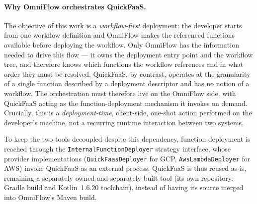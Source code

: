 \paragraph{Why OmniFlow orchestrates QuickFaaS.}
The objective of this work is a \emph{workflow-first} deployment: the developer starts from one
workflow definition and OmniFlow makes the referenced functions available before deploying
the workflow. Only OmniFlow has the information needed to drive this flow --- it owns the
deployment entry point and the workflow tree, and therefore knows which functions the
workflow references and in what order they must be resolved. QuickFaaS, by contrast, operates at the
granularity of a single function described by a deployment descriptor and has no notion of a
workflow. The orchestration must therefore live on the OmniFlow side, with QuickFaaS acting as the
function-deployment mechanism it invokes on demand. Crucially, this is a \emph{deployment-time},
client-side, one-shot action performed on the developer's machine, not a recurring runtime
interaction between two systems.

To keep the two tools decoupled despite this dependency, function deployment is reached through the
\texttt{InternalFunctionDeployer} strategy interface, whose provider implementations
(\texttt{QuickFaasDeployer} for GCP, \texttt{AwsLambdaDeployer} for AWS) invoke QuickFaaS as an
external process. QuickFaaS is thus reused as-is, remaining a separately owned and separately built
tool (its own repository, Gradle build and Kotlin~1.6.20 toolchain), instead of having its source
merged into OmniFlow's Maven build.

